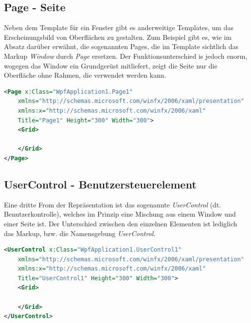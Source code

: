 \subsection*{Page - Seite}
Neben dem Template für ein Fenster gibt es anderweitige Templates, um das Erscheinungsbild von Oberflächen zu gestalten.
Zum Beispiel gibt es, wie im Absatz darüber erwähnt, die sogenannten Pages, die im Template sichtlich das Markup \textit{Window} 
durch \textit{Page} ersetzen. Der Funktionsunterschied is jedoch enorm, wogegen das Window ein Grundgerüst mitliefert, zeigt die 
Seite nur die Oberfläche ohne Rahmen, die verwendet werden kann.
\pagebreak
\begin{lstlisting}[language=XML,
    frame=single,           % Ein Rahmen um den Code
    framexleftmargin=15pt,  % Rahmen link von den Zahlen
    style=algoBericht,
    label={page-template},
    captionpos=b,           % Caption unter den Code setzen
caption={Page-Template}]
<Page x:Class="WpfApplication1.Page1"
    xmlns="http://schemas.microsoft.com/winfx/2006/xaml/presentation"
    xmlns:x="http://schemas.microsoft.com/winfx/2006/xaml"
    Title="Page1" Height="300" Width="300">
    <Grid>

    </Grid>
</Page>
\end{lstlisting}
\subsection*{UserControl - Benutzersteuerelement}
Eine dritte From der Repräsentation ist das sogenannte \textit{UserControl} (dt. Benutzerkontrolle), welches im Prinzip eine 
Mischung aus einem Window und einer Seite ist. Der Unterschied zwischen den einzelnen Elementen ist lediglich das Markup,
bzw. die Namensgebung \textit{UserControl}. 
\begin{lstlisting}[language=XML,
    frame=single,           % Ein Rahmen um den Code
    framexleftmargin=15pt,  % Rahmen link von den Zahlen
    style=algoBericht,
    label={usercontrol-template},
    captionpos=b,           % Caption unter den Code setzen
caption={UserControl-Template}]
<UserControl x:Class="WpfApplication1.UserControl1"
    xmlns="http://schemas.microsoft.com/winfx/2006/xaml/presentation"
    xmlns:x="http://schemas.microsoft.com/winfx/2006/xaml"
    Title="UserControl1" Height="300" Width="300">
    <Grid>

    </Grid>
</UserControl>
\end{lstlisting}
